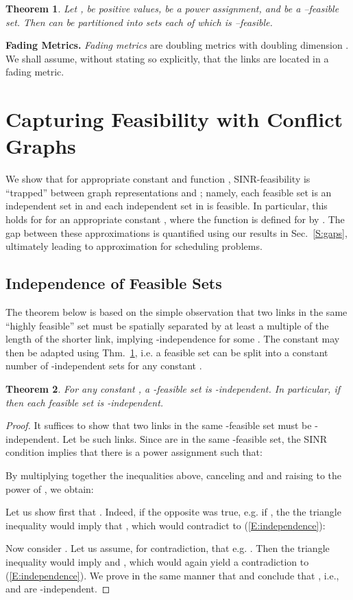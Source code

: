 \documentclass[11pt]{article}
\newcommand{\mypara}[1]{\smallskip\noindent\textbf{#1.}}  \newcommand{\tightpara}[1]{\noindent\textbf{#1.}}
\newcommand{\subsec}[1]{\subsection{#1}}
\newtheorem{theorem}{Theorem}
\begin{document}
 \begin{theorem}\cite{HB14}\label{T:signalstrengthening}
Let ,  be positive values,  be a power assignment,  and   be a --feasible set.
Then  can be partitioned into  sets each of which is --feasible.
 \end{theorem}

\mypara{Fading Metrics}
\emph{Fading metrics} are doubling metrics with doubling dimension . We shall assume,
without stating so explicitly, that the links are located in a fading metric.


\section{Capturing Feasibility with Conflict Graphs}\label{S:sandwich}

We show that for appropriate constant  and function , SINR-feasibility is ``trapped'' between graph representations  and ; namely, each  feasible set is an independent set in   and each independent set in  is feasible. 
 In particular, this holds for  for an appropriate constant , where the function \label{G:tlog} is defined for  by
.
The gap between these approximations is quantified using our results in Sec.\ \ref{S:gaps}, ultimately leading to  approximation for scheduling problems.

\subsec{Independence of Feasible Sets}
The theorem below is based on the simple observation that two links in the same ``highly feasible'' set must be spatially separated by at least a multiple of the length of the shorter link, implying -independence for some . The constant  may then be adapted using Thm.\ \ref{T:signalstrengthening}, i.e. a feasible set can be split into a constant number of -independent sets for any constant .
\begin{theorem}\label{T:lowerbound}
For any constant , a -feasible set is -independent. In particular, if  then each feasible set is -independent.
\end{theorem}

\begin{proof}
It suffices to show that two links in the same -feasible set must be -independent. Let  be such links. Since  are in the same -feasible set, the SINR condition implies that there is a power assignment  such that:

By multiplying together the inequalities above, canceling  and  and raising to the power of , we obtain: 

 Let us show first that . Indeed, if the opposite was true, e.g. if , the the triangle inequality would imply that , which would contradict to (\ref{E:independence}): 


Now consider . Let us assume, for contradiction, that e.g.  . Then the triangle inequality would imply  and , which would again yield a contradiction to (\ref{E:independence}). We  prove in the same manner that  and conclude that , i.e.,  and  are -independent.
\end{proof}
\end{document}
